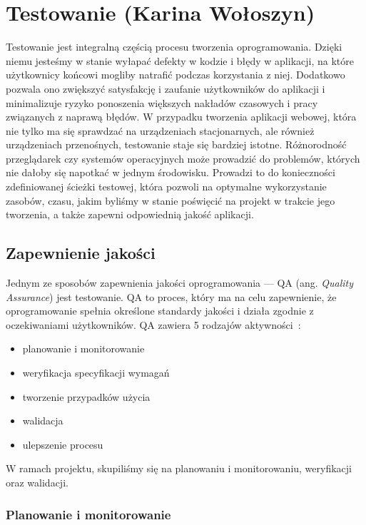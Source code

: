 \chapter{Testowanie (Karina Wołoszyn)}
\label{chap:tests}

Testowanie jest integralną częścią procesu tworzenia oprogramowania. Dzięki niemu jesteśmy w stanie wyłapać defekty w kodzie i błędy w aplikacji, na które użytkownicy końcowi mogliby natrafić podczas korzystania z niej. Dodatkowo pozwala ono zwiększyć satysfakcję i zaufanie użytkowników do aplikacji i minimalizuje ryzyko ponoszenia większych nakładów czasowych i pracy związanych z naprawą błędów. W przypadku tworzenia aplikacji webowej, która nie tylko ma się sprawdzać na urządzeniach stacjonarnych, ale również urządzeniach przenośnych, testowanie staje się bardziej istotne. Różnorodność przeglądarek czy systemów operacyjnych może prowadzić do problemów, których nie dałoby się napotkać w jednym środowisku. Prowadzi to do konieczności zdefiniowanej ścieżki testowej, która pozwoli na optymalne wykorzystanie zasobów, czasu, jakim byliśmy w stanie poświęcić na projekt w trakcie jego tworzenia, a także zapewni odpowiednią jakość aplikacji.

\section{Zapewnienie jakości}

Jednym ze sposobów zapewnienia jakości oprogramowania — QA (ang. \textit{Quality Assurance}) jest testowanie. QA to proces, który ma na celu zapewnienie, że oprogramowanie spełnia określone standardy jakości i działa zgodnie z oczekiwaniami użytkowników. QA zawiera 5 rodzajów aktywności~\cite{baresipezze2006}:

\begin{itemize}
    \item planowanie i monitorowanie
    \item weryfikacja specyfikacji wymagań
    \item tworzenie przypadków użycia
    \item walidacja
    \item ulepszenie procesu
\end{itemize}

W ramach projektu, skupiliśmy się na planowaniu i monitorowaniu, weryfikacji oraz walidacji. 

\subsection{Planowanie i monitorowanie}

